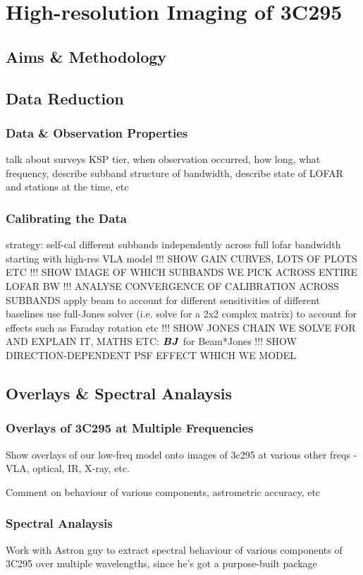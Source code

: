 \chapter{High-resolution Imaging of 3C295}

\section{Aims \& Methodology}



\section{Data Reduction}

\subsection{Data \& Observation Properties}
\pg
talk about surveys KSP tier, when observation occurred, how long, what frequency, describe subband structure of bandwidth, describe state of LOFAR and stations at the time, etc

\subsection{Calibrating the Data}
\pg
strategy: self-cal different subbands independently across full lofar bandwidth starting with high-res VLA model
\pg
               !!! SHOW GAIN CURVES, LOTS OF PLOTS ETC
\pg
               !!! SHOW IMAGE OF WHICH SUBBANDS WE PICK ACROSS ENTIRE LOFAR BW
\pg
               !!! ANALYSE CONVERGENCE OF CALIBRATION ACROSS SUBBANDS
\pg
apply beam to account for different sensitivities of different baselines
\pg
use full-Jones solver (i.e. solve for a 2x2 complex matrix) to account for effects such as Faraday rotation etc
\pg
!!! SHOW JONES CHAIN WE SOLVE FOR AND EXPLAIN IT, MATHS ETC: ${\bm{B}}{\bm{J}}$ for Beam*Jones
\pg
!!! SHOW DIRECTION-DEPENDENT PSF EFFECT WHICH WE MODEL


\section{Overlays \& Spectral Analaysis}

\subsection{Overlays of 3C295 at Multiple Frequencies}
\pg
Show overlays of our low-freq model onto images of 3c295 at various other freqs - VLA, optical, IR, X-ray, etc.

\pg
Comment on behaviour of various components, astrometric accuracy, etc

\subsection{Spectral Analaysis}

\pg
Work with Astron guy to extract spectral behaviour of various components of 3C295 over multiple wavelengths, since he's got a purpose-built package